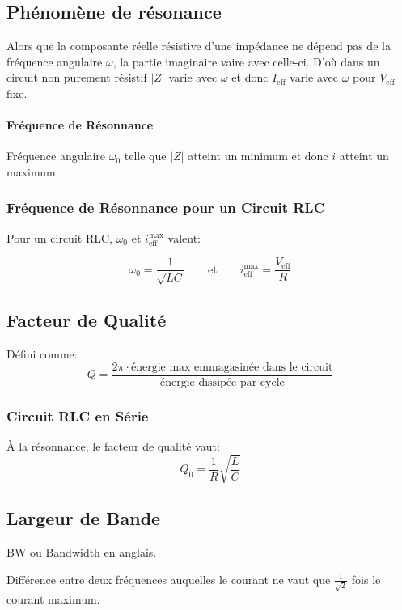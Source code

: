 \begin{multicols*}{2}
    \subsection{Phénomène de résonance}
    
    Alors que la composante réelle résistive d'une impédance ne dépend pas de la fréquence angulaire $\omega$, la partie imaginaire vaire avec celle-ci. D'où dans un circuit non purement résistif $|Z|$ varie avec $\omega$ et donc $I_{\text{eff}}$ varie avec $\omega$ pour $V_{\text{eff}}$ fixe.
    
    \paragraph{Fréquence de Résonnance}
    Fréquence angulaire $\omega_0$ telle que $|Z|$ atteint un minimum et donc $i$ atteint un maximum.
    
    \subsubsection{Fréquence de Résonnance pour un Circuit RLC}
    
    Pour un circuit RLC, $\omega_0$ et $i_{\text{eff}}^{\text{max}}$ valent:
    
    \[ \omega_0 = \frac{1}{\sqrt{LC}} \qquad \text{et} \qquad i_{\text{eff}}^{\text{max}} = \frac{V_{\text{eff}}}{R} \]
    
    \subsection{Facteur de Qualité}
    
    Défini comme:
    \[ Q = \frac{2\pi \cdot \text{énergie max emmagasinée dans le circuit}}{\text{énergie dissipée par cycle}} \]
    
    \subsubsection{Circuit RLC en Série} 
    À la résonnance, le facteur de qualité vaut:
    \[ Q_0 = \frac{1}{R} \sqrt{\frac{L}{C}} \]
    
    \subsection{Largeur de Bande}
    BW ou Bandwidth en anglais.
    
    Différence entre deux fréquences auquelles le courant ne vaut que $\frac{1}{\sqrt{2}}$ fois le courant maximum.
    

\end{multicols*}
